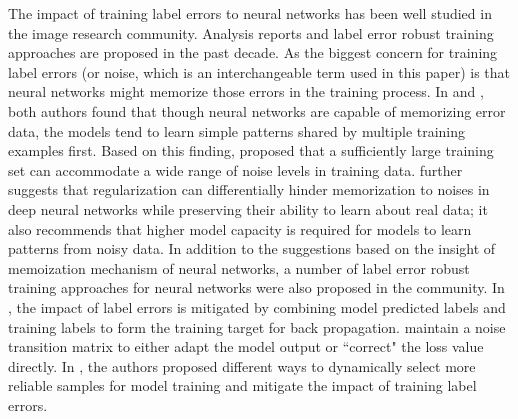 \documentclass{article}
\begin{document}
The impact of training label errors to neural networks has been well studied in the image research community. Analysis reports \cite{Rolnick2017,Arplt2017} and label error robust training approaches are proposed in the past decade. As the biggest concern for training label errors (or noise, which is an interchangeable term used in this paper) is that neural networks might memorize those errors in the training process. In \cite{Rolnick2017} and \cite{Arplt2017}, both authors found that though neural networks are capable of memorizing error data, the models tend to learn simple patterns shared by multiple training examples first. Based on this finding, \cite{Rolnick2017} proposed that a sufficiently large training set can accommodate a wide range of noise levels in training data. \cite{Arplt2017} further suggests that regularization can differentially hinder memorization to noises in deep neural networks while preserving their ability to learn about real data; it also recommends that higher model capacity is required for models to learn patterns from noisy data. In addition to the suggestions based on the insight of memoization mechanism of neural networks, a number of label error robust training approaches for neural networks were also proposed in  the community. In \cite{Reed2015}, the impact of label errors is mitigated by combining model predicted labels and training labels to form the training target for back propagation. \cite{Goldberger2017,Patrini2017} maintain a noise transition matrix to either adapt the model output or ``correct" the loss value directly. In \cite{Han2018,Yu2019,Jiang2018,Malach2017}, the authors proposed different ways to dynamically select more reliable samples for model training and mitigate the impact of training label errors.


\end{document}
